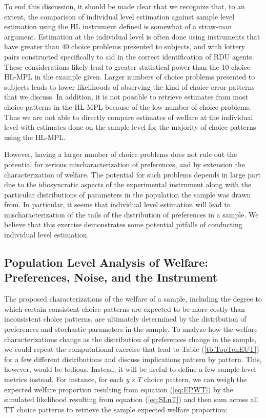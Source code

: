 \documentclass[../main.tex]{subfiles}
\begin{document}
To end this discussion, it should be made clear that we recognize that, to an extent, the comparison of individual level estimation against sample level estimation using the HL instrument defined is somewhat of a straw-man argument.
Estimation at the individual level is often done using instruments that have greater than 40 choice problems presented to subjects, and with lottery pairs constructed specifically to aid in the correct identification of RDU agents.
These considerations likely lead to greater statistical power than the 10-choice HL-MPL in the example given.
Larger numbers of choice problems presented to subjects leads to lower likelihoods of observing the kind of choice error patterns that we discuss.
In addition, it is not possible to retrieve estimates from most choice patterns in the HL-MPL because of the low number of choice problems.
Thus we are not able to directly compare estimates of welfare at the individual level with estimates done on the sample level for the majority of choice patterns using the HL-MPL.

However, having a larger number of choice problems does not rule out the potential for serious mischaracterization of preferences, and by extension the characterization of welfare.
The potential for such problems depends in large part due to the idiosyncratic aspects of the experimental instrument along with the particular distributions of parameters in the population the sample was drawn from.
In particular, it seems that individual level estimation will lead to mischaracterization of the tails of the distribution of preferences in a sample.
We believe that this exercise demonstrates some potential pitfalls of conducting individual level estimation.


\subsection{Population Level Analysis of Welfare: Preferences, Noise, and the Instrument}

The proposed characterizations of the welfare of a sample, including the degree to which certain consistent choice patterns are expected to be more costly than inconsistent choice patterns, are ultimately determined by the distribution of preferences and stochastic parameters in the sample.
To analyze how the welfare characterizations change as the distribution of preferences change in the sample, we could repeat the computational exercise that lead to Table (\ref{tb:TopTenEUT}) for a few different distributions and discuss implications pattern by pattern.
This, however, would be tedious.
Instead, it will be useful to define a few sample-level metrics instead.
For instance, for each $y \times T$ choice pattern, we can weigh the expected welfare proportion resulting from equation (\ref{eq:EPWT}) by the simulated likelihood resulting from equation (\ref{eq:SLnT}) and then sum across all TT choice patterns to retrieve the sample expected welfare proportion:
\end{document}
